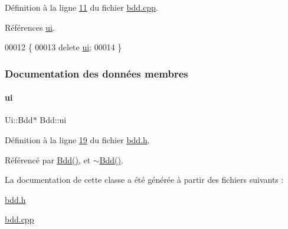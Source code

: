 Définition à la ligne \hyperlink{bdd_8cpp_source_l00011}{11} du fichier \hyperlink{bdd_8cpp_source}{bdd.\+cpp}.



Références \hyperlink{bdd_8h_source_l00019}{ui}.


\begin{DoxyCode}
00012 \{
00013     \textcolor{keyword}{delete} \hyperlink{class_bdd_a7d9f43a44caaddb2f5ccd728ecc78c2a}{ui};
00014 \}
\end{DoxyCode}


\subsubsection{Documentation des données membres}
\mbox{\label{class_bdd_a7d9f43a44caaddb2f5ccd728ecc78c2a}} 
\paragraph{\texorpdfstring{ui}{ui}}
{\footnotesize\ttfamily Ui\+::\+Bdd$\ast$ Bdd\+::ui\hspace{0.3cm}{\ttfamily [private]}}



Définition à la ligne \hyperlink{bdd_8h_source_l00019}{19} du fichier \hyperlink{bdd_8h_source}{bdd.\+h}.



Référencé par \hyperlink{bdd_8cpp_source_l00004}{Bdd()}, et \hyperlink{bdd_8cpp_source_l00011}{$\sim$\+Bdd()}.



La documentation de cette classe a été générée à partir des fichiers suivants \+:\begin{DoxyCompactItemize}
\item 
\hyperlink{bdd_8h}{bdd.\+h}\item 
\hyperlink{bdd_8cpp}{bdd.\+cpp}\end{DoxyCompactItemize}

